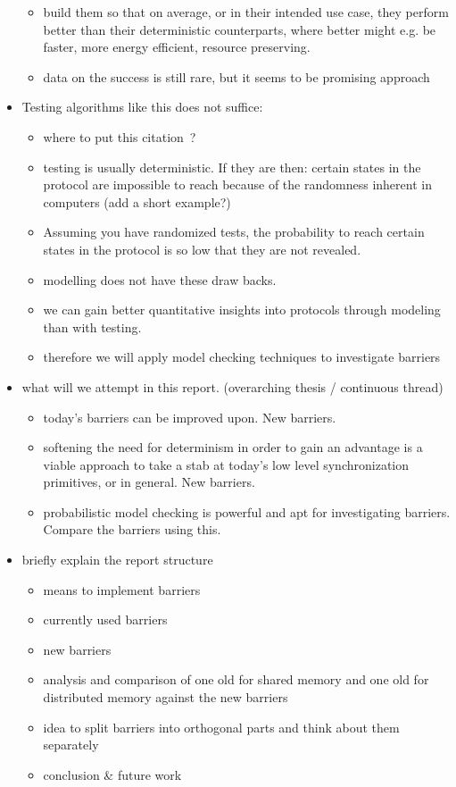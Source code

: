 \documentclass[a4paper, 10pt]{article}
\begin{document}
\begin{itemize}
\begin{itemize}
			\item build them so that on average, or in their intended use case, they perform better than their deterministic counterparts, where better might e.g. be faster, more energy efficient, resource preserving.
			\item data on the success is still rare, but it seems to be promising approach
		\end{itemize}
	\item Testing algorithms like this does not suffice:
		\begin{itemize}
			\item where to put this citation~\cite{bai13}?
			\item testing is usually deterministic. If they are then: certain states in the protocol are impossible to reach because of the randomness inherent in computers (add a short example?)
			\item Assuming you have randomized tests, the probability to reach certain states in the protocol is so low that they are not revealed.
			\item modelling does not have these draw backs.
			\item we can gain better quantitative insights into protocols through modeling than with testing.
			\item therefore we will apply model checking techniques to investigate barriers
		\end{itemize}
	\item what will we attempt in this report. (overarching thesis / continuous thread)
		\begin{itemize}
			\item today's barriers can be improved upon. New barriers.
			\item softening the need for determinism in order to gain an advantage is a viable approach to take a stab at today's low level synchronization primitives, or in general. New barriers.
			\item probabilistic model checking is powerful and apt for investigating barriers. Compare the barriers using this.
		\end{itemize}
	\item briefly explain the report structure
		\begin{itemize}
			\item means to implement barriers
			\item currently used barriers
			\item new barriers
			\item analysis and comparison of one old for shared memory and one old for distributed memory against the new barriers
			\item idea to split barriers into orthogonal parts and think about them separately
			\item conclusion \& future work
		\end{itemize}
\end{itemize}
\end{document}
